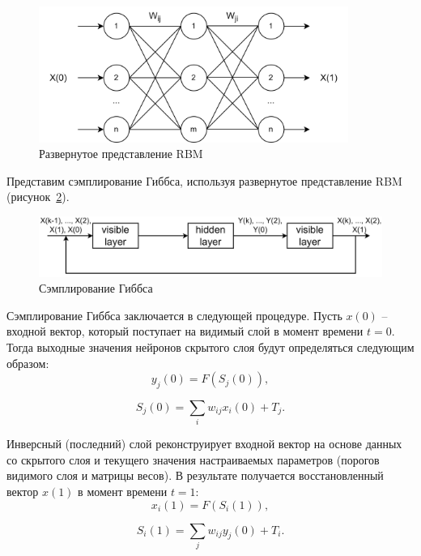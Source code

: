 \begin{figure}[H]
  \centering
  \includegraphics[width=0.9\textwidth]{man-source/images/ch2/pic2-1.png}
  \caption{Развернутое представление RBM}
  \label{fig:pic2_1}
\end{figure}

Представим сэмплирование Гиббса, используя развернутое представление RBM (рисунок~\ref{fig:pic2_2}).

\begin{figure}[H]
  \centering
  \includegraphics[width=\textwidth]{man-source/images/ch2/pic2-2.png}
  \caption{Сэмплирование Гиббса}
  \label{fig:pic2_2}
\end{figure}

Сэмплирование Гиббса заключается в следующей процедуре. Пусть $x(0)$ -- входной вектор, который поступает на видимый слой в момент времени $t=0$. Тогда выходные значения нейронов скрытого слоя будут определяться следующим образом:
\begin{equation}
    y_j(0)=F(S_j(0)),
\end{equation}

\begin{equation}
    S_j(0)=\sum_i w_{ij}x_i(0)+T_j.
\end{equation}

Инверсный (последний) слой  реконструирует входной вектор на основе данных со скрытого слоя и текущего значения настраиваемых параметров (порогов видимого слоя и матрицы весов). В результате получается восстановленный вектор $x(1)$ в момент времени $t=1$:
\begin{equation}
    x_i(1)=F(S_i(1)),
\end{equation}

\begin{equation}
    S_i(1)=\sum_j w_{ij}y_j(0)+T_i.
\end{equation}

